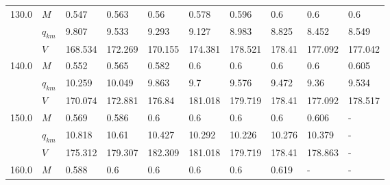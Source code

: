 \begin{tabular}{|l|l|llllllll|}
\hline
130.0 & $M$ &                     0.547 &                    0.563 &                      0.56 &                     0.578 &                     0.596 &      0.6 &      0.6\cellcolor{green} &                       0.6 \\
      & $q_{km}$ &                     9.807 &                    9.533 &                     9.293 &                     9.127 &                     8.983 &    8.825 &    8.452\cellcolor{green} &                     8.549 \\
      & $V$ &                   168.534 &                  172.269 &                   170.155 &                   174.381 &                   178.521 &   178.41 &  177.092\cellcolor{green} &                   177.042 \\
\hline
140.0 & $M$ &                     0.552 &                    0.565 &                     0.582 &                       0.6 &                       0.6 &      0.6 &      0.6\cellcolor{green} &                     0.605 \\
      & $q_{km}$ &                    10.259 &                   10.049 &                     9.863 &                       9.7 &                     9.576 &    9.472 &     9.36\cellcolor{green} &                     9.534 \\
      & $V$ &                   170.074 &                  172.881 &                    176.84 &                   181.018 &                   179.719 &   178.41 &  177.092\cellcolor{green} &                   178.517 \\
\hline
150.0 & $M$ &                     0.569 &                    0.586 &                       0.6 &                       0.6 &      0.6\cellcolor{green} &      0.6 &                     0.606 &                         - \\
      & $q_{km}$ &                    10.818 &                    10.61 &                    10.427 &                    10.292 &   10.226\cellcolor{green} &   10.276 &                    10.379 &                         - \\
      & $V$ &                   175.312 &                  179.307 &                   182.309 &                   181.018 &  179.719\cellcolor{green} &   178.41 &                   178.863 &                         - \\
\hline
160.0 & $M$ &                     0.588 &                      0.6 &                       0.6 &      0.6\cellcolor{green} &                       0.6 &    0.619 &                         - &                         - \\

\end{tabular}
